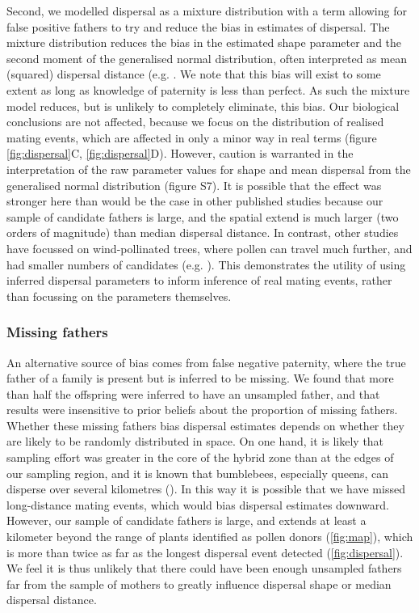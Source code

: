 \documentclass[10pt, a4paper, twocolumn]{article} %
\begin{document}
Second, we modelled dispersal as a mixture distribution with a term allowing for false positive fathers to try and reduce the bias in estimates of dispersal.
The mixture distribution reduces the bias in the estimated shape parameter and the second moment of the generalised normal distribution, often interpreted as mean (squared) dispersal distance (e.g. \cite{clark1998trees, austerlitz2004using, klein2008pollen}.
We note that this bias will exist to some extent as long as knowledge of paternity is less than perfect.
As such the mixture model reduces, but is unlikely to completely eliminate, this bias.
Our biological conclusions are not affected, because we focus on the distribution of realised mating events, which are affected in only a minor way in real terms (figure \ref{fig:dispersal}C, \ref{fig:dispersal}D).
However, caution is warranted in the interpretation of the raw parameter values for shape and mean dispersal from the generalised normal distribution (figure S7).
It is possible that the effect was stronger here than would be the case in other published studies because our sample of candidate fathers is large, and the spatial extend is much larger (two orders of magnitude) than median dispersal distance.
In contrast, other studies have focussed on wind-pollinated trees, where pollen can travel much further, and had smaller numbers of candidates (e.g. \cite{adams1992using, austerlitz2004using, klein2008pollen}).
This demonstrates the utility of using inferred dispersal parameters to inform inference of real mating events, rather than focussing on the parameters themselves.

\subsubsection{Missing fathers}

An alternative source of bias comes from false negative paternity, where the true father of a family is present but is inferred to be missing.
We found that more than half the offspring were inferred to have an unsampled father, and that results were insensitive to prior beliefs about the proportion of missing fathers.
Whether these missing fathers bias dispersal estimates depends on whether they are likely to be randomly distributed in space.
On one hand, it is likely that sampling effort was greater in the core of the hybrid zone than at the edges of our sampling region, and it is known that bumblebees, especially queens, can disperse over several kilometres (\cite{osborne2008bumblebee, hagen2011space, lepais2010estimation}).
In this way it is possible that we have missed long-distance mating events, which would bias dispersal estimates downward.
However, our sample of candidate fathers is large, and extends at least a kilometer beyond the range of plants identified as pollen donors (\ref{fig:map}), which is more than twice as far as the longest dispersal event detected (\ref{fig:dispersal}).
We feel it is thus unlikely that there could have been enough unsampled fathers far from the sample of mothers to greatly influence dispersal shape or median dispersal distance.
\end{document}
